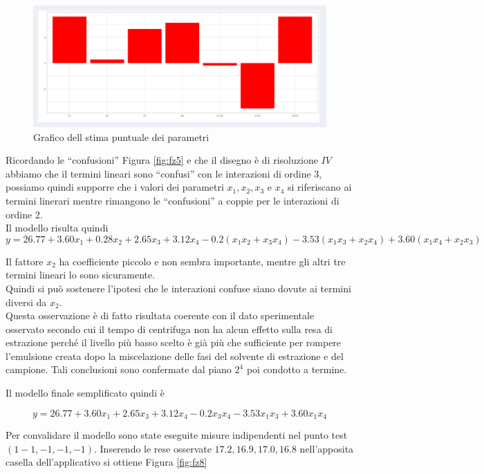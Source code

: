 \documentclass[
  11pt,
]{book}
\begin{document}
\begin{figure}[ht]

{\centering \includegraphics[width=1\linewidth]{Immagini/Fraz/07_graf_parametri} 

}

\caption{Grafico dell stima puntuale dei parametri}\label{fig:fz7}
\end{figure}

Ricordando le ``confusioni'' Figura \ref{fig:fz5} e che il disegno è di risoluzione \(IV\) abbiamo che il termini lineari sono ``confusi'' con le interazioni di ordine 3, possiamo quindi supporre che i valori dei parametri \(x_1,x_2,x_3\) e \(x_4\) si riferiscano ai termini linerari mentre rimangono le ``confusioni'' a coppie per le interazioni di ordine 2.\\
Il modello risulta quindi
\[
y=26.77+3.60x_1+0.28x_2+2.65x_3+3.12x_4-0.2(x_1x_2+x_3x_4)-3.53(x_1x_3+x_2x_4)+3.60(x_1x_4+x_2x_3)
\]

Il fattore \(x_2\) ha coefficiente piccolo e non sembra importante, mentre gli altri tre termini lineari lo sono sicuramente.\\
Quindi si può sostenere l'ipotesi che le interazioni confuse siano dovute ai termini diversi da \(x_2\).\\
Questa osservazione è di fatto risultata coerente con il dato sperimentale osservato secondo cui il tempo di centrifuga non ha alcun effetto sulla resa di estrazione perché il livello più basso scelto è già più che sufficiente per rompere l'emulsione creata dopo la miscelazione delle fasi del solvente di estrazione e del campione.
Tali conclusioni sono confermate dal piano \(2^4\) poi condotto a termine.

Il modello finale semplificato quindi è

\[
y=26.77+3.60x_1+2.65x_3+3.12x_4-0.2x_3x_4-3.53x_1x_3+3.60x_1x_4
\]

Per convalidare il modello sono state eseguite misure indipendenti nel punto test \((1-1,-1,-1,-1)\). Inserendo le rese osservate \(17.2,16.9,17.0,16.8\) nell'apposita casella dell'applicativo si ottiene Figura \ref{fig:fz8}
\end{document}
